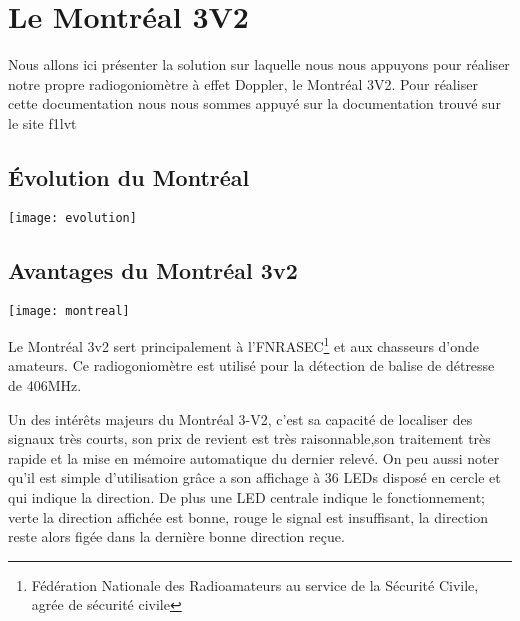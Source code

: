 \chapter{Le Montréal 3V2}
\label{montreal}

Nous allons ici présenter la solution sur laquelle nous nous appuyons pour réaliser notre propre radiogoniomètre à effet Doppler, le Montréal 3V2.
Pour réaliser cette documentation nous nous sommes appuyé sur la documentation trouvé sur le site f1lvt \cite{montreal}

\section{Évolution du Montréal}

\texttt{[image: evolution]}

\section{Avantages du Montréal 3v2}

\begin{center}
  \texttt{[image: montreal]}
\end{center}

\parindent=15pt
Le Montréal 3v2 sert principalement à l'FNRASEC\footnote{Fédération Nationale des Radioamateurs au service de la Sécurité Civile, agrée de sécurité civile} et aux chasseurs d'onde amateurs. Ce radiogoniomètre est utilisé pour la détection de balise de détresse de 406MHz.


Un des intérêts majeurs du Montréal 3-V2, c'est sa capacité de localiser des signaux très courts, son prix de revient est très raisonnable,son traitement très rapide et la mise en mémoire automatique du dernier relevé. On peu aussi noter qu'il est simple d'utilisation grâce a son affichage à 36 LEDs disposé en cercle et qui indique la direction. De plus une LED centrale indique le fonctionnement; verte la direction affichée est bonne, rouge le signal est insuffisant, la direction reste alors figée dans la dernière bonne direction reçue.


